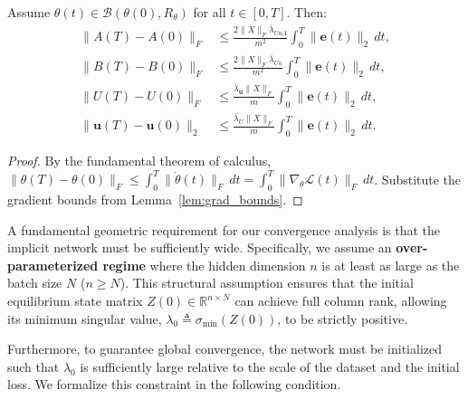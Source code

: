 \documentclass[twoside]{article}
\newcommand{\Lc}{\mathcal{L}}
\newcommand{\Bc}{\mathcal{B}}
\newcommand{\ehat}{\mathbf{e}}
\newcommand{\ub}{\mathbf{u}}
\begin{document}
\begin{lemma}\label{lem:drift}
Assume $\theta(t) \in \Bc(\theta(0),R_\theta)$ for all $t \in [0,T]$.  Then:
\begin{align}
  \|A(T)-A(0)\|_F &\leq \frac{2\|X\|_F\bar\lambda_{Uu A}}{m^2}\int_0^T\|\ehat(t)\|_2\,dt, \label{eq:drift_A}\\
  \|B(T)-B(0)\|_F &\leq \frac{2\|X\|_F\bar\lambda_{Uu}}{m^2}\int_0^T\|\ehat(t)\|_2\,dt, \label{eq:drift_B}\\
  \|U(T)-U(0)\|_F &\leq \frac{\bar\lambda_\ub\|X\|_F}{m}\int_0^T\|\ehat(t)\|_2\,dt, \label{eq:drift_U}\\
  \|\ub(T)-\ub(0)\|_2 &\leq \frac{\bar\lambda_U\|X\|_F}{m}\int_0^T\|\ehat(t)\|_2\,dt. \label{eq:drift_u}
\end{align}
\end{lemma}
\begin{proof}
By the fundamental theorem of calculus,
$\|\theta(T)-\theta(0)\|_F \leq \int_0^T\|\dot\theta(t)\|_F\,dt = \int_0^T\|\nabla_\theta\Lc(t)\|_F\,dt$.
Substitute the gradient bounds from Lemma~\ref{lem:grad_bounds}.
\end{proof}

A fundamental geometric requirement for our convergence analysis is that the implicit network must be sufficiently wide. Specifically, we assume an \textbf{over-parameterized regime} where the hidden dimension $n$ is at least as large as the batch size $N$ ($n \ge N$). This structural assumption ensures that the initial equilibrium state matrix $Z(0) \in \mathbb{R}^{n \times N}$ can achieve full column rank, allowing its minimum singular value, $\lambda_0 \triangleq \sigma_{\min}(Z(0))$, to be strictly positive.

Furthermore, to guarantee global convergence, the network must be initialized such that $\lambda_0$ is sufficiently large relative to the scale of the dataset and the initial loss. We formalize this constraint in the following condition.

\end{document}
